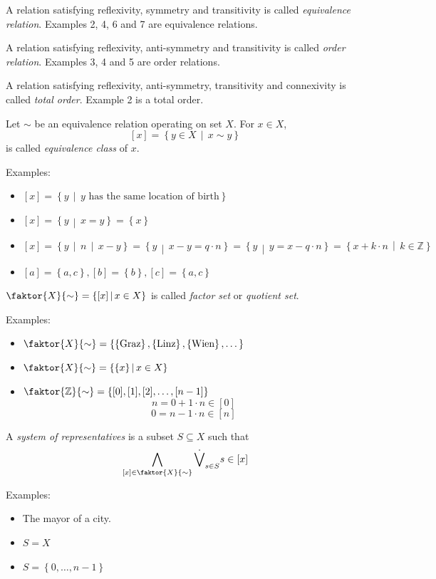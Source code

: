 \documentclass[a4paper,landscape,twocolumn]{article}
\newcommand\set[1]{\left\{#1\right\}}
\newcommand\setdef[2]{\left\{#1\,\middle|\,#2\right\}}
\newcommand\divides[2]{#1\,\mid\,#2}
\begin{document}
A relation satisfying reflexivity, symmetry and transitivity is called \emph{equivalence relation}.
Examples 2, 4, 6 and 7 are equivalence relations.

A relation satisfying reflexivity, anti-symmetry and transitivity is called \emph{order relation}.
Examples 3, 4 and 5 are order relations.

A relation satisfying reflexivity, anti-symmetry, transitivity and connexivity is called \emph{total order}.
Example 2 is a total order.

Let $\sim$ be an equivalence relation operating on set $X$.
For $x \in X$,
\[ [x] = \setdef{y \in X}{x \sim y} \]
is called \emph{equivalence class} of $x$.

Examples:
\begin{itemize}
  \item $[x] = \setdef{y}{y \text{ has the same location of birth}}$
  \item $[x] = \setdef{y}{x = y} = \set{x}$
  \item $[x] = \setdef{y}{\divides{n}{x - y}} = \setdef{y}{x - y = q\cdot n} = \setdef{y}{y = x - q \cdot n} = \setdef{x + k \cdot n}{k \in \mathbb{Z}}$
  \item $[a] = \set{a, c}, [b] = \set{b}, [c] = \set{a, c}$
\end{itemize}

$\faktor{X}{\sim} = \setdef{[x]}{x \in X}$ is called \emph{factor set} or \emph{quotient set}.

Examples:
\begin{itemize}
  \item $\faktor{X}{\sim} = \set{\set{\text{Graz}}, \set{\text{Linz}}, \set{\text{Wien}}, \dots}$
  \item $\faktor{X}{\sim} = \setdef{\set{x}}{x \in X}$
  \item $\faktor{\mathbb{Z}}{\sim} = \set{[0], [1], [2], \ldots, [n-1]}$
     \[ n = 0 + 1 \cdot n \in [0] \]
     \[ 0 = n - 1 \cdot n \in [n] \]
\end{itemize}

A \emph{system of representatives} is a subset $S \subseteq X$ such that
\[ \bigwedge_{[x] \in \faktor{X}{\sim}} \dot\bigvee_{s \in S} s \in [x] \]

Examples:
\begin{itemize}
  \item The mayor of a city.
  \item $S = X$
  \item $S = \set{0, \ldots, n - 1}$
\end{itemize}
\end{document}
